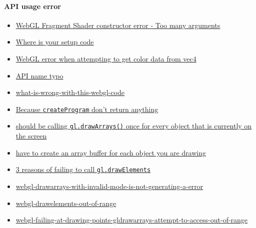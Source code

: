 \documentclass[]{article}
\begin{document}
\paragraph{API usage error}\label{api-usage-error}

\begin{itemize}
\itemsep1pt\parskip0pt
\item
  \href{http://stackoverflow.com/questions/33725228/webgl-fragment-shader-constructor-error-too-many-arguments}{WebGL
  Fragment Shader constructor error - Too many arguments}
\item
  \href{http://stackoverflow.com/questions/28490041/webgl-vbo-error-in-firefox}{Where
  is your setup code}
\item
  \href{http://stackoverflow.com/questions/32618792/webgl-error-when-attempting-to-get-color-data-from-vec4}{WebGL
  error when attempting to get color data from vec4}
\item
  \href{http://stackoverflow.com/questions/26544800/simple-triangle-in-webgl}{API
  name typo}
\item
  \href{http://stackoverflow.com/questions/21436678/what-is-wrong-with-this-webgl-code}{what-is-wrong-with-this-webgl-code}
\item
  \href{http://stackoverflow.com/questions/33057640/why-my-mutiple-animated-objects-are-not-displayed-by-my-code-webgl}{Because
  \texttt{createProgram} don't return anything}
\item
  \href{http://stackoverflow.com/questions/19758786/webgl-keep-previous-object}{should
  be calling \texttt{gl.drawArrays()} once for every object that is
  currently on the screen}
\item
  \href{http://stackoverflow.com/questions/17316171/webgl-drawarrays-attribs-not-setup-correctly}{have
  to create an array buffer for each object you are drawing}
\item
  \href{http://stackoverflow.com/questions/32447641/what-is-common-cause-of-range-out-of-bounds-of-buffer-in-webgl}{3
  reasons of failing to call \texttt{gl.drawElements}}
\item
  \href{http://stackoverflow.com/questions/8900559/webgl-drawarrays-with-invalid-mode-is-not-generating-a-error}{webgl-drawarrays-with-invalid-mode-is-not-generating-a-error}
\item
  \href{http://stackoverflow.com/questions/15751791/webgl-drawelements-out-of-range}{webgl-drawelements-out-of-range}
\item
  \href{http://stackoverflow.com/questions/31750163/webgl-failing-at-drawing-points-gldrawarrays-attempt-to-access-out-of-range}{webgl-failing-at-drawing-points-gldrawarrays-attempt-to-access-out-of-range}

\end{itemize}
\end{document}
